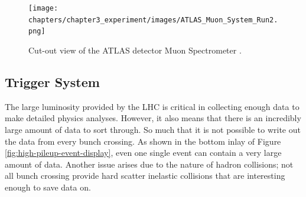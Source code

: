 		\begin{figure}[!ht]
		\centering
		\texttt{[image: chapters/chapter3\_experiment/images/ATLAS\_Muon\_System\_Run2.png]}
		\caption{Cut-out view of the \gls{ATLAS} detector Muon Spectrometer \cite{atlas-schematics}.}
		\label{fig:muon-spec}
		\end{figure}

	\subsection{Trigger System}\label{ssec:trigger}
		The large luminosity provided by the \gls{LHC} is critical in collecting enough data to make detailed physics analyses. However, it also means that there is an incredibly large amount of data to sort through. So much that it is not possible to write out the data from every bunch crossing. As shown in the bottom inlay of Figure \ref{fig:high-pileup-event-display}, even one single event can contain a very large amount of data. Another issue arises due to the nature of hadron collisions; not all bunch crossing provide hard scatter inelastic collisions that are interesting enough to save data on. 

